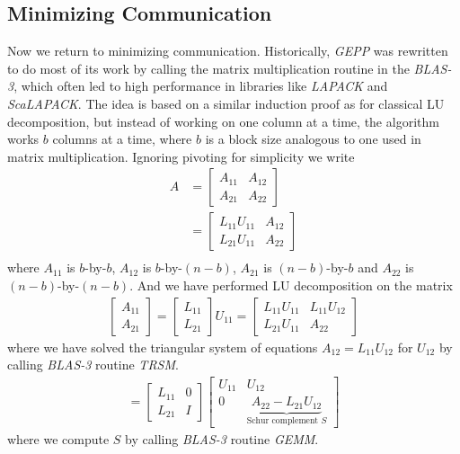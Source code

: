 \documentclass[11pt]{article}
\numberwithin{equation}{section}
\begin{document}
\subsection{Minimizing Communication}
Now we return to minimizing communication. Historically, \textit{GEPP} was rewritten to do most of its work by calling the matrix multiplication routine in the \textit{BLAS-3}, 
which often led to high performance in libraries like \textit{LAPACK} and \textit{ScaLAPACK}. The idea is based on a similar induction proof as for classical LU decomposition, 
but instead of working on one column at a time, the algorithm works $b$ columns at a time, where $b$ is a block size analogous to one used in matrix multiplication. 
Ignoring pivoting for simplicity we write \begin{align*}
    A &= \left[\begin{array}{ll}
        A_{11} & A_{12} \\
        A_{21} & A_{22}
        \end{array}\right] \\
    &= \left[\begin{array}{ll}
        L_{11}U_{11} & A_{12} \\
        L_{21}U_{11} & A_{22}
        \end{array}\right] \\
\end{align*}
where $A_{11}$ is $b$-by-$b$, $A_{12}$ is $b$-by-$(n-b)$, $A_{21}$ is $(n-b)$-by-$b$ and $A_{22}$ is $(n-b)$-by-$(n-b)$. 
And we have performed LU decomposition on the matrix \begin{align*}
    \left[\begin{array}{l}
        A_{11} \\
        A_{21}
        \end{array}\right]=\left[\begin{array}{l}
        L_{11} \\
        L_{21}
        \end{array}\right]U_{11} = \left[\begin{array}{ll}
            L_{11} U_{11} & L_{11} U_{12} \\
            L_{21} U_{11} & A_{22}
            \end{array}\right]
\end{align*}
where we have solved the triangular system of equations $A_{12} = L_{11} U_{12}$ for $U_{12}$ by calling \textit{BLAS-3} routine \textit{TRSM}. \begin{align*}
    = \left[\begin{array}{ll}
        L_{11} & 0 \\
        L_{21} & I
        \end{array}\right]\left[\begin{array}{ll}
        U_{11} & U_{12} \\
        0 & \underbrace{A_{22}-L_{21}U_{12}}_{\text{Schur complement }S}
        \end{array}\right]
\end{align*}
where we compute $S$ by calling \textit{BLAS-3} routine \textit{GEMM}.
\end{document}
